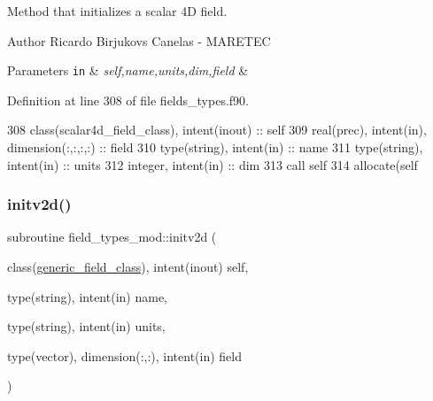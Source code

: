 Method that initializes a scalar 4D field. 

\begin{DoxyAuthor}{Author}
Ricardo Birjukovs Canelas -\/ M\+A\+R\+E\+T\+EC 
\end{DoxyAuthor}

\begin{DoxyParams}[1]{Parameters}
\mbox{\tt in}  & {\em self,name,units,dim,field} & \\
\hline
\end{DoxyParams}


Definition at line 308 of file fields\+\_\+types.\+f90.


\begin{DoxyCode}
308     \textcolor{keywordtype}{class}(scalar4d\_field\_class), \textcolor{keywordtype}{intent(inout)} :: self
309     \textcolor{keywordtype}{real(prec)}, \textcolor{keywordtype}{intent(in)}, \textcolor{keywordtype}{dimension(:,:,:,:)} :: field
310     \textcolor{keywordtype}{type}(string), \textcolor{keywordtype}{intent(in)} :: name
311     \textcolor{keywordtype}{type}(string), \textcolor{keywordtype}{intent(in)} :: units
312     \textcolor{keywordtype}{integer}, \textcolor{keywordtype}{intent(in)} :: dim
313     \textcolor{keyword}{call }self%
314     \textcolor{keyword}{allocate}(self%
\end{DoxyCode}
\mbox{\label{namespacefield__types__mod_a26cb1df2a85bf21d45693942957c9dae}} 
\subsubsection{\texorpdfstring{initv2d()}{initv2d()}}
{\footnotesize\ttfamily subroutine field\+\_\+types\+\_\+mod\+::initv2d (\begin{DoxyParamCaption}\item[{class(\mbox{\hyperlink{structfield__types__mod_1_1generic__field__class}{generic\+\_\+field\+\_\+class}}), intent(inout)}]{self,  }\item[{type(string), intent(in)}]{name,  }\item[{type(string), intent(in)}]{units,  }\item[{type(vector), dimension(\+:,\+:), intent(in)}]{field }\end{DoxyParamCaption})\hspace{0.3cm}{\ttfamily [private]}}



